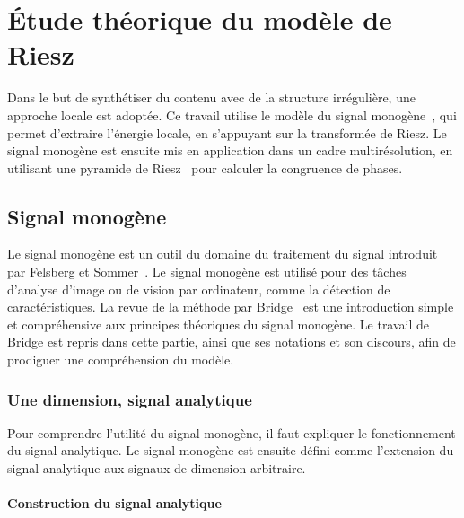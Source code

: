\chapter{Étude théorique du modèle de Riesz}
\label{ch:chapitre1}

Dans le but de synthétiser du contenu avec de la structure irrégulière, une approche locale est adoptée. Ce travail utilise le modèle du signal monogène~\cite{felsberg_monogenic_2001}, qui permet d'extraire l'énergie locale, en s'appuyant sur la transformée de Riesz. Le signal monogène est ensuite mis en application dans un cadre multirésolution, en utilisant une pyramide de Riesz~\cite{wadhwa_riesz_2014} pour calculer la congruence de phases.

\section{Signal monogène}

Le signal monogène est un outil du domaine du traitement du signal introduit par Felsberg et Sommer~\cite{felsberg_monogenic_2001}. Le signal monogène est utilisé pour des tâches d'analyse d'image ou de vision par ordinateur, comme la détection de caractéristiques. La revue de la méthode par Bridge~\cite{bridge_introduction_2018} est une introduction simple et compréhensive aux principes théoriques du signal monogène. Le travail de Bridge est repris dans cette partie, ainsi que ses notations et son discours, afin de prodiguer une compréhension du modèle.

\subsection{Une dimension, signal analytique}

Pour comprendre l'utilité du signal monogène, il faut expliquer le fonctionnement du signal analytique. Le signal monogène est ensuite défini comme l'extension du signal analytique aux signaux de dimension arbitraire. 

\subsubsection{Construction du signal analytique}


